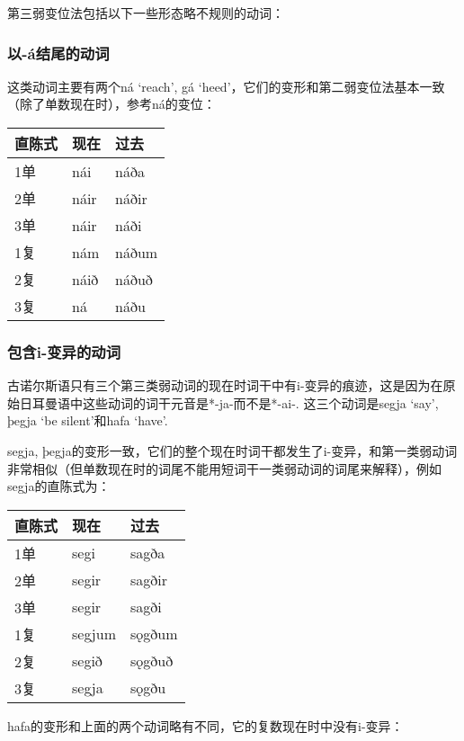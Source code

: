 第三弱变位法包括以下一些形态略不规则的动词：


\subsubsection{以-á结尾的动词}


这类动词主要有两个ná `reach', gá
`heed'，它们的变形和第二弱变位法基本一致（除了单数现在时），参考ná的变位：

\begin{longtable}{lll}
    \toprule
    直陈式 & 现在 & 过去  \\
    \midrule
    \endhead
    \bottomrule
    \endfoot
    1单    & nái  & náða  \\
    2单    & náir & náðir \\
    3单    & náir & náði  \\
    1复    & nám  & náðum \\
    2复    & náið & náðuð \\
    3复    & ná   & náðu  \\
\end{longtable}


\subsubsection{包含i-变异的动词}


古诺尔斯语只有三个第三类弱动词的现在时词干中有i-变异的痕迹，这是因为在原始日耳曼语中这些动词的词干元音是*-ja-而不是*-ai-.
这三个动词是segja `say', þegja `be silent'和hafa `have'.

segja, þegja的变形一致，它们的整个现在时词干都发生了i-变异，和第一类弱动词非常相似（但单数现在时的词尾不能用短词干一类弱动词的词尾来解释），例如segja的直陈式为：

\begin{longtable}{lll}
    \toprule
    直陈式 & 现在   & 过去   \\
    \midrule
    \endhead
    \bottomrule
    \endfoot
    1单    & segi   & sagða  \\
    2单    & segir  & sagðir \\
    3单    & segir  & sagði  \\
    1复    & segjum & sǫgðum \\
    2复    & segið  & sǫgðuð \\
    3复    & segja  & sǫgðu  \\
\end{longtable}

hafa的变形和上面的两个动词略有不同，它的复数现在时中没有i-变异：

